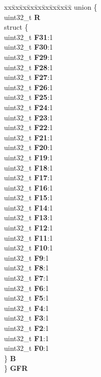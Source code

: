 \begin{DoxyCompactItemize}
\begin{tabbing}
\end{tabbing}\item 
\mbox{\label{structEMIOS__tag_ace0a04e4fc5c69991e2752c073667358}} 
\begin{tabbing}
xx\=xx\=xx\=xx\=xx\=xx\=xx\=xx\=xx\=\kill
union \{\\
\>uint32\_t {\bfseries R}\\
\>struct \{\\
\>\>uint32\_t {\bfseries F31}:1\\
\>\>uint32\_t {\bfseries F30}:1\\
\>\>uint32\_t {\bfseries F29}:1\\
\>\>uint32\_t {\bfseries F28}:1\\
\>\>uint32\_t {\bfseries F27}:1\\
\>\>uint32\_t {\bfseries F26}:1\\
\>\>uint32\_t {\bfseries F25}:1\\
\>\>uint32\_t {\bfseries F24}:1\\
\>\>uint32\_t {\bfseries F23}:1\\
\>\>uint32\_t {\bfseries F22}:1\\
\>\>uint32\_t {\bfseries F21}:1\\
\>\>uint32\_t {\bfseries F20}:1\\
\>\>uint32\_t {\bfseries F19}:1\\
\>\>uint32\_t {\bfseries F18}:1\\
\>\>uint32\_t {\bfseries F17}:1\\
\>\>uint32\_t {\bfseries F16}:1\\
\>\>uint32\_t {\bfseries F15}:1\\
\>\>uint32\_t {\bfseries F14}:1\\
\>\>uint32\_t {\bfseries F13}:1\\
\>\>uint32\_t {\bfseries F12}:1\\
\>\>uint32\_t {\bfseries F11}:1\\
\>\>uint32\_t {\bfseries F10}:1\\
\>\>uint32\_t {\bfseries F9}:1\\
\>\>uint32\_t {\bfseries F8}:1\\
\>\>uint32\_t {\bfseries F7}:1\\
\>\>uint32\_t {\bfseries F6}:1\\
\>\>uint32\_t {\bfseries F5}:1\\
\>\>uint32\_t {\bfseries F4}:1\\
\>\>uint32\_t {\bfseries F3}:1\\
\>\>uint32\_t {\bfseries F2}:1\\
\>\>uint32\_t {\bfseries F1}:1\\
\>\>uint32\_t {\bfseries F0}:1\\
\>\} {\bfseries B}\\
\} {\bfseries GFR}\\


\end{tabbing}
\end{DoxyCompactItemize}

